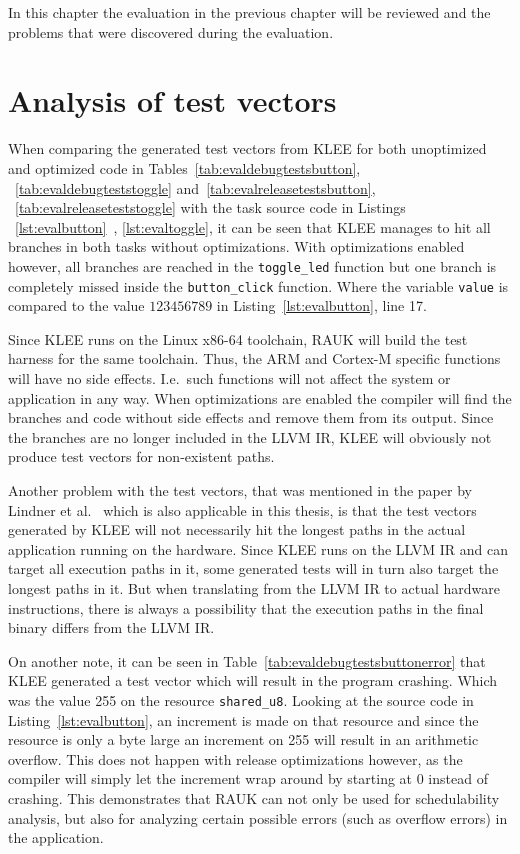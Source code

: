 In this chapter the evaluation in the previous chapter will be reviewed
and the problems that were discovered during the evaluation.

\section{Analysis of test vectors}
When comparing the generated test vectors from KLEE for both unoptimized and
optimized code in Tables~\ref{tab:evaldebugtestsbutton},
~\ref{tab:evaldebugteststoggle} and~\ref{tab:evalreleasetestsbutton},
~\ref{tab:evalreleaseteststoggle} with the task source code in Listings
~\ref{lst:evalbutton}~, \ref{lst:evaltoggle}, it can be seen that KLEE manages to
hit all branches in both tasks without optimizations. With optimizations
enabled however, all branches are reached in the \texttt{toggle\_led} function
but one branch is completely missed inside the \texttt{button\_click} function.
Where the variable \texttt{value} is compared to the value $123456789$ in
Listing~\ref{lst:evalbutton}, line 17.

Since KLEE runs on the Linux x86-64 toolchain, RAUK will build the test harness
for the same toolchain. Thus, the ARM and Cortex-M specific functions will have
no side effects. I.e.\ such functions will not affect the system or application
in any way. When optimizations are enabled the compiler will find the branches
and code without side effects and remove them from its output. Since the
branches are no longer included in the LLVM IR, KLEE will obviously not
produce test vectors for non-existent paths.

Another problem with the test vectors, that was mentioned in the paper by
Lindner et al.\ \cite{lindner} which is also applicable in this thesis, is that
the test vectors generated by KLEE will not necessarily hit the longest paths
in the actual application running on the hardware. Since KLEE runs on the LLVM
IR and can target all execution paths in it, some generated tests will
in turn also target the longest paths in it. But when translating from the LLVM
IR to actual hardware instructions, there is always a possibility that the
execution paths in the final binary differs from the LLVM IR\@.

On another note, it can be seen in Table~\ref{tab:evaldebugtestsbuttonerror}
that KLEE generated a test vector which will result in the program crashing.
Which was the value 255 on the resource \texttt{shared\_u8}. Looking at the
source code in Listing~\ref{lst:evalbutton}, an increment is made on that
resource and since the resource is only a byte large an increment on 255 will
result in an arithmetic overflow. This does not happen with release
optimizations however, as the compiler will simply let the increment wrap
around by starting at 0 instead of crashing. This demonstrates that RAUK
can not only be used for schedulability analysis, but also for analyzing
certain possible errors (such as overflow errors) in the application.

